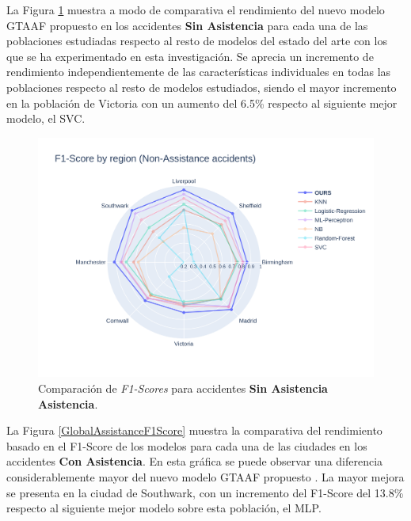 La Figura \ref{GlobalSlightF1Score} muestra a modo de comparativa el rendimiento del nuevo modelo GTAAF propuesto en los accidentes \textbf{Sin Asistencia} para cada una de las poblaciones estudiadas respecto al resto de modelos del estado del arte con los que se ha experimentado en esta investigación. Se aprecia un incremento de rendimiento independientemente de las características individuales en todas las poblaciones respecto al resto de modelos estudiados, siendo el mayor incremento en la población de Victoria con un aumento del 6.5\% respecto al siguiente mejor modelo, el SVC.

\begin{figure}[H]
	\centering
	\includegraphics[width=150mm]{Figures/Slight.png}
	\caption{Comparación de \textit{F1-Scores} para accidentes \textbf{Sin Asistencia Asistencia}.}
	\label{GlobalSlightF1Score}
\end{figure}

La Figura \ref{GlobalAssistanceF1Score} muestra la comparativa del rendimiento basado en el F1-Score de los modelos para cada una de las ciudades en los accidentes \textbf{Con Asistencia}. En esta gráfica se puede observar una diferencia considerablemente mayor del nuevo modelo GTAAF propuesto . La mayor mejora se presenta en la ciudad de Southwark, con un incremento del F1-Score del 13.8\% respecto al siguiente mejor modelo sobre esta población, el MLP.

